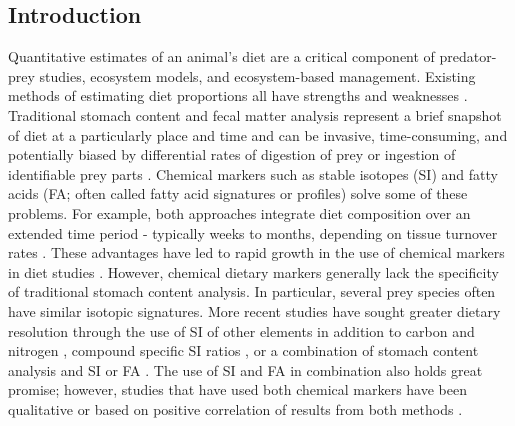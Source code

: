 \documentclass{article}%
\begin{document}
\begin{spacing}{1.9}
\begin{flushleft}
\section{Introduction}
Quantitative estimates of an animal’s diet are a critical component of
predator-prey studies, ecosystem models, and ecosystem-based
management. Existing methods of estimating diet proportions all have
strengths and weaknesses \citep{bowen_methods_2012}. Traditional
stomach content and fecal matter analysis represent a brief snapshot
of diet at a particularly place and time and can be invasive,
time-consuming, and potentially biased by differential rates of
digestion of prey or ingestion of identifiable prey parts
\citep{bowen_methods_2012}. Chemical markers such as stable isotopes
(SI) and fatty acids (FA; often called fatty acid signatures or profiles) solve some of these problems.  For
example, both approaches integrate diet composition over an extended
time period - typically weeks to months, depending on tissue turnover
rates  \citep{tucker_convergence_2008}. These advantages have led to rapid
growth in the use of chemical markers in diet studies
 \citep{elsdon_unraveling_2010,williams_using_2010,kelly_fatty_2011,
bowen_methods_2012}. However, chemical dietary markers generally lack
the specificity of traditional stomach content analysis. In
particular, several prey species often have similar isotopic signatures. More
recent studies have sought greater dietary resolution through the use
of SI of other elements in addition to carbon and
nitrogen \citep[e.g.,][]{belicka_stable_2012}, compound specific SI ratios
\citep[e.g.,][]{budge_tracing_2008,jack_individual_2011}, or a combination of stomach
content analysis and SI or FA \citep[e.g.,][]{pethybridge_seasonal_2012}. The
use of SI and FA in combination also holds great promise; however, studies that have used both chemical markers have been
qualitative \citep{[e.g.,][]guest_trophic_2009} or based on positive correlation
of results from both methods \citep{tucker_convergence_2008}.


\end{flushleft}
\end{spacing}
\end{document}
